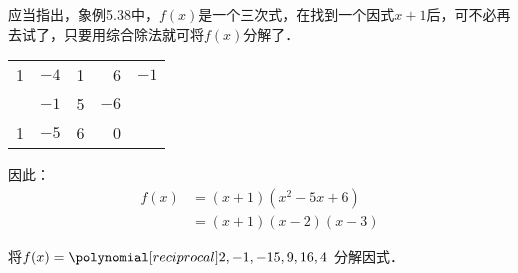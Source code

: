 应当指出，象例5.38中，$f(x)$是一个三次式，在找到一个因式$x+1$后，可不必再去试了，只要用综合除法就可将$f(x)$分解了．
\begin{center}
\begin{tabular}{rrrr|r}
    1 &$-4$&1&6  &$-1$\\
    \cline{5-5}
    & $-1$ & 5& $-6$\\
    \cline{1-4}
    1&$-5$ & 6&0\\
\end{tabular}    
\end{center}
因此：
\[\begin{split}
    f(x)&=(x+1)(x^2-5x+6)\\
    &=(x+1)(x-2)(x-3)
\end{split}\]

\begin{example}
    将$f(x)=\poly{2,-1,-15,9,16,4}$ 分解因式．
\end{example}


